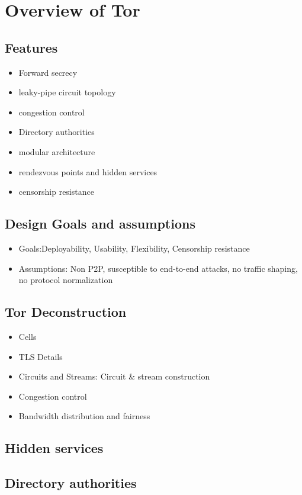 \documentclass{llncs}
\begin{document}
\section{Overview of Tor} \label{tor}
\subsection{Features}
\begin{itemize}
	\item{Forward secrecy}
	\item{leaky-pipe circuit topology}
	\item{congestion control}
	\item{Directory authorities}
	\item{modular architecture}
	\item{rendezvous points and hidden services}
	\item{censorship resistance}
\end{itemize}
\subsection{Design Goals and assumptions}
\begin{itemize}
	\item{Goals:Deployability, Usability, Flexibility, Censorship resistance}
	\item{Assumptions: Non P2P, susceptible to end-to-end attacks, no traffic shaping, no protocol normalization}
\end{itemize}
\subsection{Tor Deconstruction}
\begin{itemize}
	\item{Cells}
	\item{TLS Details}
	\item{Circuits and Streams: Circuit \& stream construction}
	\item{Congestion control}
	\item{Bandwidth distribution and fairness}
\end{itemize}
\subsection{Hidden services}
\subsection{Directory authorities}
\end{document}
